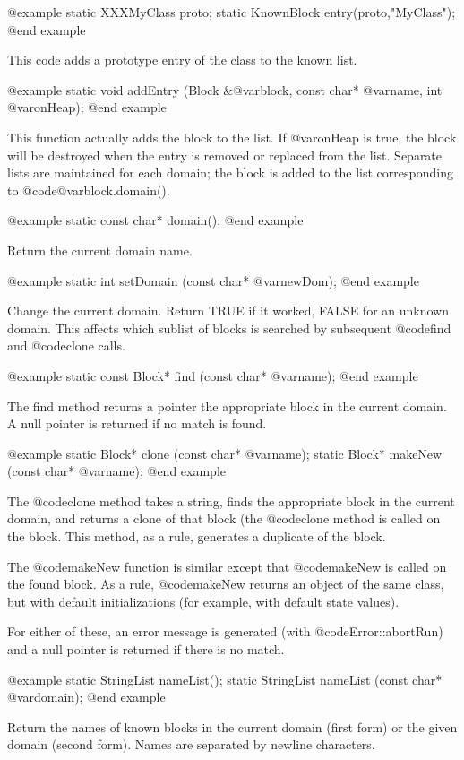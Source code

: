 @example
static XXXMyClass proto;
static KnownBlock entry(proto,"MyClass");
@end example

This code adds a prototype entry of the class to the known list.

@example
static void addEntry (Block &@var{block}, const char* @var{name}, int @var{onHeap});
@end example

This function actually adds the block to the list.  If @var{onHeap} is true,
the block will be destroyed when the entry is removed or replaced from
the list.  Separate lists are maintained for each domain; the block
is added to the list corresponding to @code{@var{block}.domain()}.

@example
static const char* domain();
@end example

Return the current domain name.

@example
static int setDomain (const char* @var{newDom});
@end example

Change the current domain.  Return TRUE if it worked, FALSE for an
unknown domain.  This affects which sublist of blocks is searched by
subsequent @code{find} and @code{clone} calls.

@example
static const Block* find (const char* @var{name});
@end example

The find method returns a pointer the appropriate block in
the current domain.  A null pointer is returned if no match
is found.

@example
static Block* clone (const char* @var{name});
static Block* makeNew (const char* @var{name});
@end example

The @code{clone} method takes a string, finds the appropriate block in
the current domain, and returns a clone of that block (the
@code{clone} method is called on the block.  This method, as
a rule, generates a duplicate of the block.

The @code{makeNew} function is similar except that @code{makeNew}
is called on the found block.  As a rule, @code{makeNew} returns
an object of the same class, but with default initializations
(for example, with default state values).

For either of these, an error message is generated (with
@code{Error::abortRun}) and a null pointer is returned if there is no
match.

@example
static StringList nameList();
static StringList nameList (const char* @var{domain});
@end example

Return the names of known blocks in the current domain (first form) or
the given domain (second form).  Names are
separated by newline characters.

